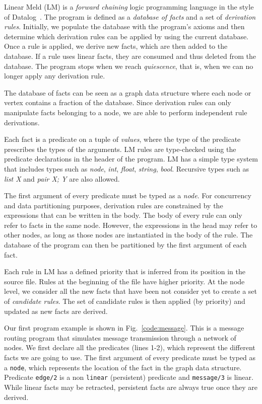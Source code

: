 
Linear Meld (LM) is a \emph{forward chaining} logic programming language in the style of Datalog~\cite{Ullman:1990:PDK:533142}. The program is defined as a \emph{database of facts} and a set of \emph{derivation rules}.
Initially, we populate the database with the program's axioms and then determine which derivation rules can be applied by using the current database. Once a rule is applied, we derive new facts, which are then added to the database.
If a rule uses linear facts, they are consumed and thus deleted from the database.
The program stops when we reach \emph{quiescence}, that is, when we can no longer
apply any derivation rule.

The database of facts can be seen as a graph data structure where each node or vertex contains a
fraction of the database.  Since derivation rules can only manipulate facts belonging to
a node, we are able to perform independent rule derivations.

Each fact is a predicate on a tuple of \emph{values}, where the type of the predicate prescribes the types of the arguments.
LM rules are type-checked using the predicate declarations in the header of the program. LM has a simple type system that includes types such as
\emph{node}, \emph{int}, \emph{float}, \emph{string}, \emph{bool}. Recursive types such as \emph{list X} and \emph{pair X; Y} are
also allowed.

The first argument of every predicate must be typed as a \emph{node}.
For concurrency and data partitioning purposes, derivation rules are constrained by the expressions that can be written in the body.
The body of every rule can only refer to facts in the same node.
However, the expressions in the head may refer to other nodes, as long as those nodes are instantiated in the body of the rule.
The database of the program can then be partitioned by the first argument of each fact.

Each rule in LM has a defined priority that is inferred from its position in the source file.
Rules at the beginning of the file have higher priority. At the node level, we consider all
the new facts that have been not consider yet to create a set of \emph{candidate rules}.
The set of candidate rules is then applied (by priority) and updated as new facts are derived.

Our first program example is shown in Fig.~\ref{code:message}. This is a message routing program
that simulates message transmission through a network of nodes.
We first declare all the predicates (lines 1-2), which represent the different facts we are going to
use. The first argument of every predicate must be typed as a \texttt{node}, which represents the location of the fact in
the graph data structure.
Predicate \texttt{edge/2} is a non \texttt{linear} (persistent) predicate and \texttt{message/3} is linear. While linear facts may be retracted, persistent facts are always
true once they are derived.

